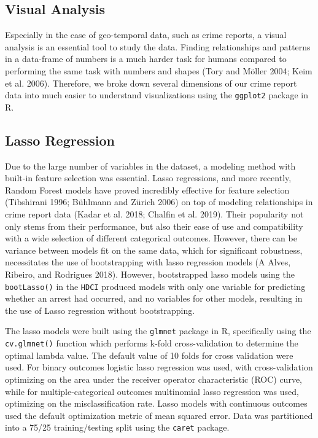 \documentclass{ucetd}
\begin{document}
\hypertarget{visual-analysis}{%
\subsection{Visual Analysis}\label{visual-analysis}}

Especially in the case of geo-temporal data, such as crime reports, a
visual analysis is an essential tool to study the data. Finding
relationships and patterns in a data-frame of numbers is a much harder
task for humans compared to performing the same task with numbers and
shapes (Tory and Möller 2004; Keim et al. 2006). Therefore, we broke
down several dimensions of our crime report data into much easier to
understand visualizations using the \texttt{ggplot2} package in R.

\hypertarget{lasso-regression}{%
\subsection{Lasso Regression}\label{lasso-regression}}

Due to the large number of variables in the dataset, a modeling method
with built-in feature selection was essential. Lasso regressions, and
more recently, Random Forest models have proved incredibly effective for
feature selection (Tibshirani 1996; Bühlmann and Zürich 2006) on top of
modeling relationships in crime report data (Kadar et al. 2018; Chalfin
et al. 2019). Their popularity not only stems from their performance,
but also their ease of use and compatibility with a wide selection of
different categorical outcomes. However, there can be variance between
models fit on the same data, which for significant robustness,
necessitates the use of bootstrapping with lasso regression models (A
Alves, Ribeiro, and Rodrigues 2018). However, bootstrapped lasso models
using the \texttt{bootLasso()} in the \texttt{HDCI} produced models with
only one variable for predicting whether an arrest had occurred, and no
variables for other models, resulting in the use of Lasso regression
without bootstrapping.

The lasso models were built using the \texttt{glmnet} package in R,
specifically using the \texttt{cv.glmnet()} function which performs
k-fold cross-validation to determine the optimal lambda value. The
default value of 10 folds for cross validation were used. For binary
outcomes logistic lasso regression was used, with cross-validation
optimizing on the area under the receiver operator characteristic (ROC)
curve, while for multiple-categorical outcomes multinomial lasso
regression was used, optimizing on the misclassification rate. Lasso
models with continuous outcomes used the default optimization metric of
mean squared error. Data was partitioned into a 75/25 training/testing
split using the \texttt{caret} package.
\end{document}
